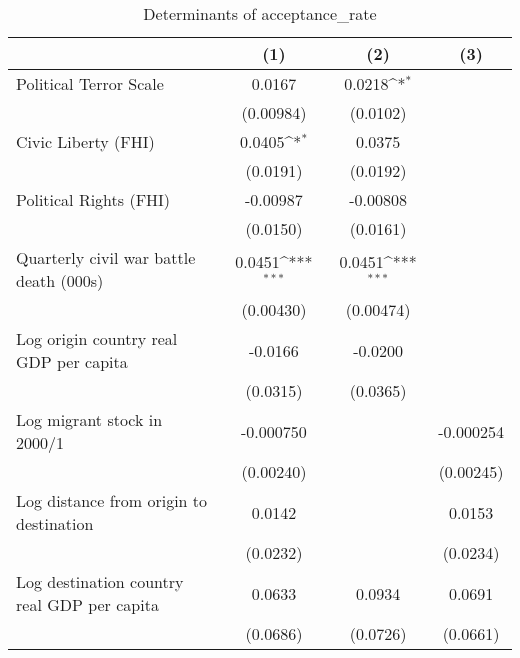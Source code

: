 \begin{table}[htbp]\centering
\def\sym#1{\ifmmode^{#1}\else\(^{#1}\)\fi}
\caption{Determinants of acceptance\_rate}
\begin{tabular}{l*{3}{c}}
\hline\hline
                    &\multicolumn{1}{c}{(1)}         &\multicolumn{1}{c}{(2)}         &\multicolumn{1}{c}{(3)}         \\
\hline
Political Terror Scale&      0.0167         &      0.0218\sym{*}  &                     \\
                    &   (0.00984)         &    (0.0102)         &                     \\
[1em]
Civic Liberty (FHI) &      0.0405\sym{*}  &      0.0375         &                     \\
                    &    (0.0191)         &    (0.0192)         &                     \\
[1em]
Political Rights (FHI)&    -0.00987         &    -0.00808         &                     \\
                    &    (0.0150)         &    (0.0161)         &                     \\
[1em]
Quarterly civil war battle death (000s)&      0.0451\sym{***}&      0.0451\sym{***}&                     \\
                    &   (0.00430)         &   (0.00474)         &                     \\
[1em]
Log origin country real GDP per capita&     -0.0166         &     -0.0200         &                     \\
                    &    (0.0315)         &    (0.0365)         &                     \\
[1em]
Log migrant stock in 2000/1&   -0.000750         &                     &   -0.000254         \\
                    &   (0.00240)         &                     &   (0.00245)         \\
[1em]
Log distance from origin to destination&      0.0142         &                     &      0.0153         \\
                    &    (0.0232)         &                     &    (0.0234)         \\
[1em]
Log destination country real GDP per capita&      0.0633         &      0.0934         &      0.0691         \\
                    &    (0.0686)         &    (0.0726)         &    (0.0661)         \\

\end{tabular}
\end{table}
